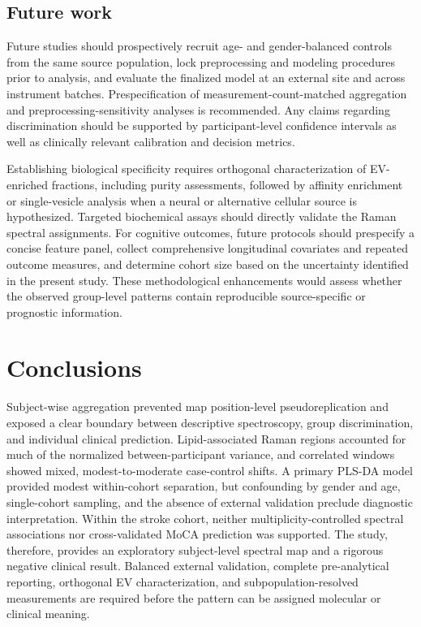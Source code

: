 \documentclass[preprint,12pt]{elsarticle}
\begin{document}
\subsection{Future work} 
\label{subsec:future_work}

Future studies should prospectively recruit age- and gender-balanced controls from the same source population, lock preprocessing and modeling procedures prior to analysis, and evaluate the finalized model at an external site and across instrument batches. Prespecification of measurement-count-matched aggregation and preprocessing-sensitivity analyses is recommended. Any claims regarding discrimination should be supported by participant-level confidence intervals as well as clinically relevant calibration and decision metrics.

Establishing biological specificity requires orthogonal characterization of EV-enriched fractions, including purity assessments, followed by affinity enrichment or single-vesicle analysis when a neural or alternative cellular source is hypothesized. Targeted biochemical assays should directly validate the Raman spectral assignments. For cognitive outcomes, future protocols should prespecify a concise feature panel, collect comprehensive longitudinal covariates and repeated outcome measures, and determine cohort size based on the uncertainty identified in the present study. These methodological enhancements would assess whether the observed group-level patterns contain reproducible source-specific or prognostic information.

\section{Conclusions} 
\label{sec:conclusions}

Subject-wise aggregation prevented map position-level pseudoreplication and exposed a clear boundary between descriptive spectroscopy, group discrimination, and individual clinical prediction. Lipid-associated Raman regions accounted for much of the normalized between-participant variance, and correlated windows showed mixed, modest-to-moderate case-control shifts. A primary PLS-DA model provided modest within-cohort separation, but confounding by gender and age, single-cohort sampling, and the absence of external validation preclude diagnostic interpretation. Within the stroke cohort, neither multiplicity-controlled spectral associations nor cross-validated MoCA prediction was supported. The study, therefore, provides an exploratory subject-level spectral map and a rigorous negative clinical result. Balanced external validation, complete pre-analytical reporting, orthogonal EV characterization, and subpopulation-resolved measurements are required before the pattern can be assigned molecular or clinical meaning.
\end{document}

